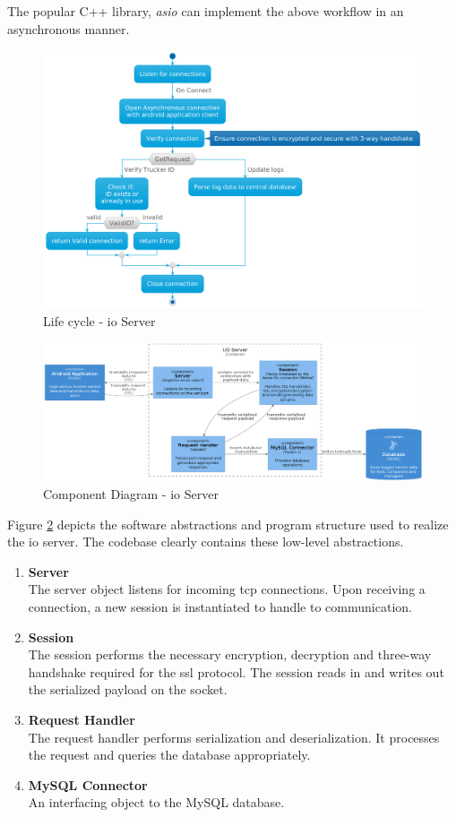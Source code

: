 The popular C++ library, \textit{asio} can implement the above workflow in an asynchronous manner.

\begin{figure}
\centering
\includegraphics[width=6in]{../diag/IO_activity.png}
\caption{Life cycle - \Ac{io} Server}
\label{fig:IO_activity}
\end{figure}

\begin{figure}[H]
\centering
\includegraphics[width=6in]{../diag/IO_component.png}
\caption{Component Diagram - \Ac{io} Server}
\label{fig:IO_component}
\end{figure}

Figure \ref{fig:IO_component} depicts the software abstractions and program structure used to realize the \ac{io} server.
The codebase clearly contains these low-level abstractions.
\begin{enumerate}
\item \textbf{Server}\\
The server object listens for incoming \ac{tcp} connections.
Upon receiving a connection, a new session is instantiated to handle to communication.
\item \textbf{Session}\\
The session performs the necessary encryption, decryption and three-way handshake required for the \ac{ssl} protocol.
The session reads in and writes out the serialized payload on the socket.
\item \textbf{Request Handler}\\
The request handler performs serialization and deserialization.
It processes the request and queries the database appropriately.
\item \textbf{MySQL Connector}\\
An interfacing object to the MySQL database.
\end{enumerate}


